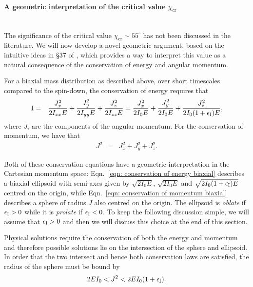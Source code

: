 \documentclass[../full_thesis/full_thesis.tex]{subfiles}
\begin{document}
\clearpage
\paragraph{A geometric interpretation of the critical value $\chi_\textrm{cr}$}\mbox{}\\
The significance of the critical value $\chi_\textrm{cr} \sim 55^{\circ}$
has not been discussed in the literature. We will now develop a novel
geometric argument, based on the intuitive ideas in \S 37 of \citet{Landau1969},
which provides a way to interpret this value as a natural
consequence of the conservation of energy and angular momentum.

For a biaxial mass distribution as described above, over short timescales compared
to the spin-down, the conservation of energy requires that
\begin{eqnarray}
1 & = & \frac{J_{x}^{2}}{2I_{xx}E}+\frac{J_{y}^{2}}{2I_{yy}E}+\frac{J_{z}^{2}}{2I_{zz}E}
=\frac{J_{x}^{2}}{2I_{0}E}+\frac{J_{y}^{2}}{2I_{0}E}+\frac{J_{z}^{2}}{2I_{0}(1+\epsilon_{\mathrm{I}})E},
\label{eqn: conservation of energy biaxial}
\end{eqnarray}
where $J_i$ are the components of the angular momentum. For the conservation of
momentum, we have that
\begin{eqnarray}
J^{2} & = & J_{x}^{2}+J_{y}^{2}+J_{z}^{2}.
\label{eqn: conservation of momentum biaxial}
\end{eqnarray}

Both of these conservation equations have a geometric interpretation in the
Cartesian momentum space: Eqn.~\eqref{eqn: conservation of energy biaxial}
describes a biaxial ellipsoid with semi-axes given by $\sqrt{2I_{0}E}$,
$\sqrt{2I_{0}E}$ and $\sqrt{2I_{0}(1+\epsilon_{\mathrm{I}})E}$ centred on the origin,
while Eqn.~\eqref{eqn: conservation of momentum biaxial} describes a sphere of
radius $J$ also centred on the origin. The ellipsoid is \emph{oblate} if $\epsilon_{\mathrm{I}}
> 0$ while it is \emph{prolate} if $\epsilon_{\mathrm{I}} < 0$. To keep the following discussion
simple, we will assume that $\epsilon_{\mathrm{I}} > 0$ and then we will discuss this choice at
the end of this section.

Physical solutions require the conservation of both
the energy and momentum and therefore possible solutions lie on the intersection
of the sphere and ellipsoid. In order that the two intersect and hence both
conservation laws are satisfied, the radius of the sphere must be bound by
\begin{equation}
2EI_{0}<J^{2}<2EI_{0}(1+\epsilon_{\mathrm{I}}).
\label{eqn: orderings}
\end{equation}
\end{document}
